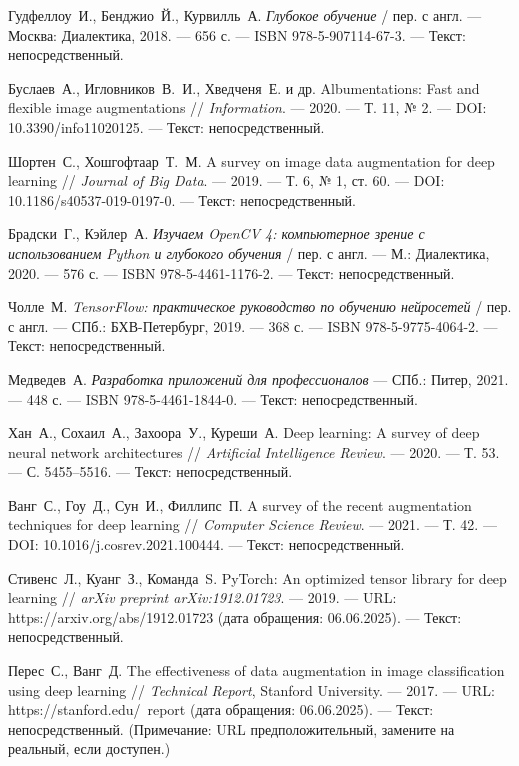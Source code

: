 
\begin{thebibliography}{99}
	
	 Гудфеллоу~И., Бенджио~Й., Курвилль~А. \emph{Глубокое обучение} / пер. с англ. — Москва: Диалектика, 2018. — 656 с. — ISBN 978-5-907114-67-3. — Текст: непосредственный.
	
	 Буслаев~А., Игловников~В.~И., Хведченя~Е. и др. Albumentations: Fast and flexible image augmentations // \emph{Information}. — 2020. — Т. 11, № 2. — DOI: 10.3390/info11020125. — Текст: непосредственный.
	
	 Шортен~С., Хошгофтаар~Т.~М. A survey on image data augmentation for deep learning // \emph{Journal of Big Data}. — 2019. — Т. 6, № 1, ст. 60. — DOI: 10.1186/s40537-019-0197-0. — Текст: непосредственный.
	
	 Брадски~Г., Кэйлер~А. \emph{Изучаем OpenCV 4: компьютерное зрение с использованием Python и глубокого обучения} / пер. с англ. — М.: Диалектика, 2020. — 576 с. — ISBN 978-5-4461-1176-2. — Текст: непосредственный.
	
	 Чолле~М. \emph{TensorFlow: практическое руководство по обучению нейросетей} / пер. с англ. — СПб.: БХВ-Петербург, 2019. — 368 с. — ISBN 978-5-9775-4064-2. — Текст: непосредственный.
	
	 Медведев~А. \emph{Разработка приложений для профессионалов} — СПб.: Питер, 2021. — 448 с. — ISBN 978-5-4461-1844-0. — Текст: непосредственный.
	
	 Хан~А., Сохаил~А., Захоора~У., Куреши~А. Deep learning: A survey of deep neural network architectures // \emph{Artificial Intelligence Review}. — 2020. — Т. 53. — С. 5455–5516. — Текст: непосредственный.
	
	 Ванг~С., Гоу~Д., Сун~И., Филлипс~П. A survey of the recent augmentation techniques for deep learning // \emph{Computer Science Review}. — 2021. — Т. 42. — DOI: 10.1016/j.cosrev.2021.100444. — Текст: непосредственный.
	
	 Стивенс~Л., Куанг~З., Команда~S. PyTorch: An optimized tensor library for deep learning // \emph{arXiv preprint arXiv:1912.01723}. — 2019. — URL: https://arxiv.org/abs/1912.01723 (дата обращения: 06.06.2025). — Текст: непосредственный.
	
	 Перес~С., Ванг~Д. The effectiveness of data augmentation in image classification using deep learning // \emph{Technical Report}, Stanford University. — 2017. — URL: https://stanford.edu/~report (дата обращения: 06.06.2025). — Текст: непосредственный. (Примечание: URL предположительный, замените на реальный, если доступен.)
	

\end{thebibliography}
